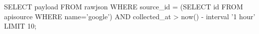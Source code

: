 SELECT payload
FROM rawjson
WHERE source_id = (SELECT id FROM apisource WHERE name='google')
  AND collected_at > now() - interval '1 hour'
LIMIT 10;